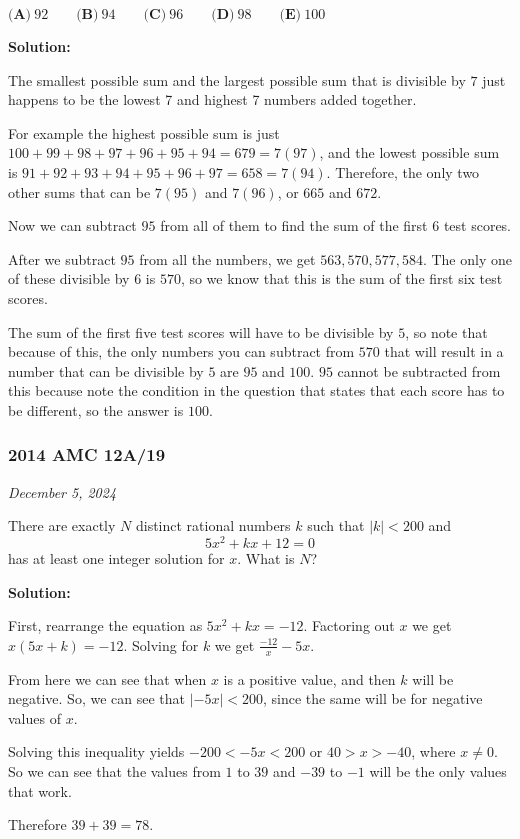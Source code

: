 \documentclass[../mathproblems.tex]{subfiles}
\begin{document}
$\textbf{(A)}\ 92\qquad\textbf{(B)}\ 94\qquad\textbf{(C)}\ 96\qquad\textbf{(D)}\ 98\qquad\textbf{(E)}\ 100$

\textbf{Solution:}

The smallest possible sum and the largest possible sum that is divisible by $7$ just happens to be the lowest 7 and highest 7 numbers added together.

For example the highest possible sum is just $100+99+98+97+96+95+94 = 679 = 7(97)$, and the lowest possible sum is $91+92+93+94+95+96+97 = 658 = 7(94)$. Therefore, the only two other sums that can be $7(95)$ and $7(96)$, or $665$ and $672$.

Now we can subtract $95$ from all of them to find the sum of the first $6$ test scores.

After we subtract $95$ from all the numbers, we get $563, 570, 577, 584$. The only one of these divisible by $6$ is $570$, so we know that this is the sum of the first six test scores.

The sum of the first five test scores will have to be divisible by $5$, so note that because of this, the only numbers you can subtract from $570$ that will result in a number that can be divisible by $5$ are $95$ and $100$. $95$ cannot be subtracted from this because note the condition in the question that states that each score has to be different, so the answer is $\boxed{100}$.

\noindent\hrulefill
\subsubsection*{2014 AMC 12A/19}
\textit{December 5, 2024}

There are exactly $N$ distinct rational numbers $k$ such that $|k|<200$ and \[5x^2+kx+12=0\] has at least one integer solution for $x$. What is $N$? 

\textbf{Solution:}

First, rearrange the equation as $5x^2+kx=-12$. Factoring out $x$ we get $x(5x+k)=-12$. Solving for $k$ we get $\frac{-12}{x}-5x$.

From here we can see that when $x$ is a positive value, and then $k$ will be negative. So, we can see that $|-5x|<200$, since the same will be for negative values of $x$.

Solving this inequality yields $-200<-5x<200$ or $40>x>-40$, where $x\neq 0$. So we can see that the values from $1$ to $39$ and $-39$ to $-1$ will be the only values that work.

Therefore $39+39=\boxed{78}$.
\end{document}
